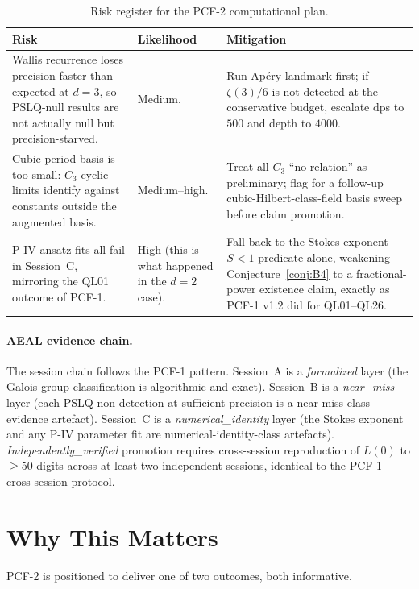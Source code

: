\documentclass[11pt,a4paper]{article}
\theoremstyle{definition}
\theoremstyle{remark}
\begin{document}
\begin{table}[h]
\centering
\small
\begin{tabular}{p{}p{}p{}}
\toprule
Risk & Likelihood & Mitigation \\
\midrule
Wallis recurrence loses precision faster than expected at $d=3$, so
PSLQ-null results are not actually null but precision-starved. & Medium. & Run Ap\'ery landmark first; if $\zeta(3)/6$ is not detected at the conservative budget, escalate dps to $500$ and depth to $4000$. \\
Cubic-period basis is too small: $C_{3}$-cyclic limits identify against
constants outside the augmented basis. & Medium--high. & Treat all $C_{3}$ ``no relation'' as pre\-li\-mi\-na\-ry; flag for a follow-up cubic-Hilbert-class-field basis sweep before claim promotion. \\
P-IV ansatz fits all fail in Session~C, mirroring the QL01 outcome of
PCF-1. & High (this is what happened in the $d=2$ case). & Fall back to the Stokes-exponent $S<1$ predicate alone, weakening Conjecture~\ref{conj:B4} to a fractional-power existence claim, exactly as PCF-1 v1.2 did for QL01--QL26. \\
\bottomrule
\end{tabular}
\caption{Risk register for the PCF-2 computational plan.}
\label{tab:risks}
\end{table}

\paragraph{AEAL evidence chain.}
The session chain follows the PCF-1 pattern. Session~A is a
\emph{formalized} layer (the Galois-group classification is algorithmic
and exact). Session~B is a \emph{near\_miss} layer (each PSLQ
non-detection at sufficient precision is a near-miss-class evidence
artefact). Session~C is a \emph{numerical\_identity} layer (the Stokes
exponent and any P-IV parameter fit are numerical-identity-class
artefacts). \emph{Independently\_verified} promotion requires
cross-session reproduction of $L(0)$ to $\ge 50$ digits across at least
two independent sessions, identical to the PCF-1 cross-session protocol.

\section{Why This Matters}\label{sec:why}

PCF-2 is positioned to deliver one of two outcomes, both informative.
\end{document}
